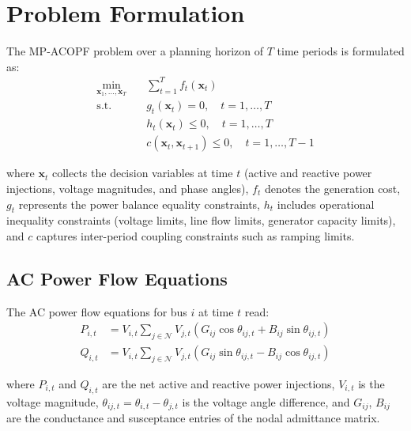 \documentclass[journal]{IEEEtran}
\begin{document}
\section{Problem Formulation}
\label{sec:problem}

The MP-ACOPF problem over a planning horizon of $T$ time periods is formulated as:
\begin{align}
  \min_{\mathbf{x}_1, \ldots, \mathbf{x}_T} \quad
    & \sum_{t=1}^{T} f_t(\mathbf{x}_t) \label{eq:obj} \\
  \text{s.t.} \quad
    & g_t(\mathbf{x}_t) = 0, \quad t = 1, \ldots, T \label{eq:eq} \\
    & h_t(\mathbf{x}_t) \leq 0, \quad t = 1, \ldots, T \label{eq:ineq} \\
    & c(\mathbf{x}_t, \mathbf{x}_{t+1}) \leq 0, \quad t = 1, \ldots, T{-}1
      \label{eq:coupling}
\end{align}

where $\mathbf{x}_t$ collects the decision variables at time $t$ (active and
reactive power injections, voltage magnitudes, and phase angles), $f_t$ denotes
the generation cost, $g_t$ represents the power balance equality constraints,
$h_t$ includes operational inequality constraints (voltage limits, line flow limits,
generator capacity limits), and $c$ captures inter-period coupling constraints
such as ramping limits.

\subsection{AC Power Flow Equations}

The AC power flow equations for bus $i$ at time $t$ read:
\begin{align}
  P_{i,t} &= V_{i,t} \sum_{j \in \mathcal{N}}
    V_{j,t} \left( G_{ij} \cos\theta_{ij,t} + B_{ij} \sin\theta_{ij,t} \right)
    \label{eq:pf_p} \\
  Q_{i,t} &= V_{i,t} \sum_{j \in \mathcal{N}}
    V_{j,t} \left( G_{ij} \sin\theta_{ij,t} - B_{ij} \cos\theta_{ij,t} \right)
    \label{eq:pf_q}
\end{align}

where $P_{i,t}$ and $Q_{i,t}$ are the net active and reactive power injections,
$V_{i,t}$ is the voltage magnitude, $\theta_{ij,t} = \theta_{i,t} - \theta_{j,t}$
is the voltage angle difference, and $G_{ij}$, $B_{ij}$ are the conductance and
susceptance entries of the nodal admittance matrix.
\end{document}
